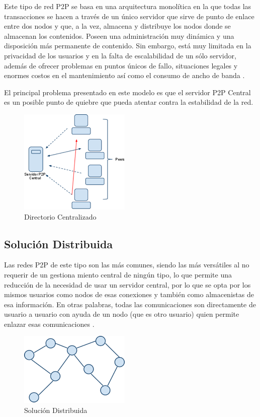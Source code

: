 Este tipo de red P2P se basa en una arquitectura monolítica en la que todas las transacciones se hacen a través de un único servidor que sirve de punto de enlace entre dos nodos y que, a la vez, almacena y distribuye los nodos donde se almacenan los contenidos. Poseen una administración muy dinámica y una disposición más permanente de contenido. Sin embargo, está muy limitada en la privacidad de los usuarios y en la falta de escalabilidad de un sólo servidor, además de ofrecer problemas en puntos únicos de fallo, situaciones legales y enormes costos en el mantenimiento así como el consumo de ancho de banda \cite{wiki_p2p}.

El principal problema presentado en este modelo es que el servidor P2P Central es un posible punto de quiebre que pueda atentar contra la estabilidad de la red.

\begin{figure}[h]
  \centering
    \includegraphics[scale=1]{gfx/p2p_central}
  \caption{Directorio Centralizado}
  \label{conexionhttp}
\end{figure}


\subsection{Solución Distribuida}

Las redes P2P de este tipo son las más comunes, siendo las más versátiles al no requerir de un gestiona miento central de ningún tipo, lo que permite una reducción de la necesidad de usar un servidor central, por lo que se opta por los mismos usuarios como nodos de esas conexiones y también como almacenistas de esa información. En otras palabras, todas las comunicaciones son directamente de usuario a usuario con ayuda de un nodo (que es otro usuario) quien permite enlazar esas comunicaciones \cite{wiki_p2p}.

\begin{figure}[h]
  \centering
    \includegraphics[scale=1]{gfx/p2p_distribuido}
  \caption{Solución Distribuida}
  \label{conexionhttp}
\end{figure}

